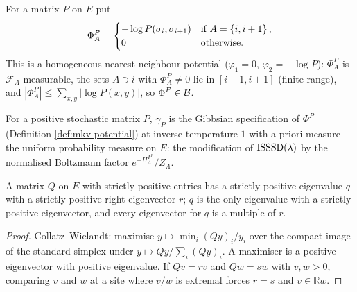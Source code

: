 \begin{definition}
    \label{def:mkv-potential}
    \leanok

    For a matrix $P$ on $E$ put
    \[
        \Phi^P_A = \begin{cases}
            -\log P(\sigma_i, \sigma_{i+1}) & \text{if } A = \left\{ i, i+1 \right\},\\
            0 & \text{otherwise.}
        \end{cases}
    \]
    This is a homogeneous nearest-neighbour potential ($\varphi_1 = 0$, $\varphi_2 = -\log P$):
    $\Phi^P_A$ is $\mathcal{F}_A$-measurable, the sets $A \ni i$ with $\Phi^P_A \neq 0$ lie in
    $[i-1, i+1]$ (finite range), and $|\Phi^P_A| \le \sum_{x,y}|\log P(x,y)|$, so
    $\Phi^P \in \mathcal{B}$.
\end{definition}

\begin{definition}
    \label{def:mkv-specification}
    \leanok

    For a positive stochastic matrix $P$, $\gamma_P$ is the Gibbsian specification of $\Phi^P$
    (Definition \ref{def:mkv-potential}) at inverse temperature $1$ with a priori measure the
    uniform probability measure on $E$: the modification of $\operatorname{ISSSD}(\lambda)$ by the normalised
    Boltzmann factor $e^{-H_\Lambda^{\Phi^P}} / Z_\Lambda$.
\end{definition}

\begin{lemma}
    \label{lem:mkv-perron}
    \leanok

    A matrix $Q$ on $E$ with strictly positive entries has a strictly positive eigenvalue $q$
    with a strictly positive right eigenvector $r$; $q$ is the only eigenvalue with a strictly
    positive eigenvector, and every eigenvector for $q$ is a multiple of $r$.
\end{lemma}
\begin{proof}
    \leanok

    Collatz--Wielandt: maximise $y \mapsto \min_i (Qy)_i / y_i$ over the compact image of the
    standard simplex under $y \mapsto Qy/\sum_i (Qy)_i$. A maximiser is a positive eigenvector
    with positive eigenvalue. If $Qv = rv$ and $Qw = sw$ with $v, w > 0$, comparing $v$ and $w$
    at a site where $v/w$ is extremal forces $r = s$ and $v \in \mathbb{R}w$.
\end{proof}

